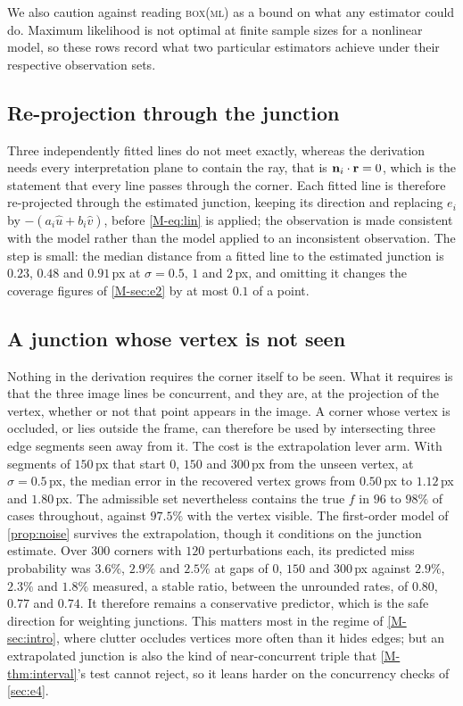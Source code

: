 We also caution against reading \textsc{box(ml)} as a bound on what any estimator could do. Maximum likelihood is not optimal at finite sample sizes for a nonlinear model, so these rows record what two particular estimators achieve under their respective observation sets.


\subsection{Re-projection through the junction}
Three independently fitted lines do not meet exactly, whereas the derivation needs every interpretation plane to contain the ray, that is $\mathbf{n}_i\cdot\mathbf{r}=0$, which is the statement that every line passes through the corner. Each fitted line is therefore re-projected through the estimated junction, keeping its direction and replacing $e_i$ by $-(a_i\hat u+b_i\hat v)$, before \eqref{M-eq:lin} is applied; the observation is made consistent with the model rather than the model applied to an inconsistent observation. The step is small: the median distance from a fitted line to the estimated junction is $0.23$, $0.48$ and $0.91$\,px at $\sigma=0.5$, $1$ and $2$\,px, and omitting it changes the coverage figures of \cref{M-sec:e2} by at most $0.1$ of a point.

\subsection{A junction whose vertex is not seen}\label{sec:occluded}
Nothing in the derivation requires the corner itself to be seen. What it requires is that the three image lines be concurrent, and they are, at the projection of the vertex, whether or not that point appears in the image. A corner whose vertex is occluded, or lies outside the frame, can therefore be used by intersecting three edge segments seen away from it. The cost is the extrapolation lever arm. With segments of $150$\,px that start $0$, $150$ and $300$\,px from the unseen vertex, at $\sigma=0.5$\,px, the median error in the recovered vertex grows from $0.50$\,px to $1.12$\,px and $1.80$\,px. The admissible set nevertheless contains the true $f$ in $96$ to $98\%$ of cases throughout, against $97.5\%$ with the vertex visible. The first-order model of \cref{prop:noise} survives the extrapolation, though it conditions on the junction estimate. Over $300$ corners with $120$ perturbations each, its predicted miss probability was $3.6\%$, $2.9\%$ and $2.5\%$ at gaps of $0$, $150$ and $300$\,px against $2.9\%$, $2.3\%$ and $1.8\%$ measured, a stable ratio, between the unrounded rates, of $0.80$, $0.77$ and $0.74$. It therefore remains a conservative predictor, which is the safe direction for weighting junctions. This matters most in the regime of \cref{M-sec:intro}, where clutter occludes vertices more often than it hides edges; but an extrapolated junction is also the kind of near-concurrent triple that \cref{M-thm:interval}'s test cannot reject, so it leans harder on the concurrency checks of \cref{sec:e4}.

